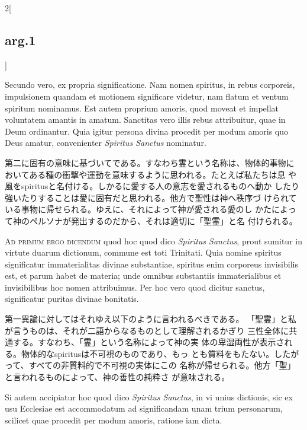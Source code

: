 \documentclass[paper=a4paper,fontsize=10pt,jafontsize=9pt,titlepage]{jlreq}
\begin{document}
\begin{paracol}{2}[\subsection{arg.1}]
\switchcolumn*

Secundo vero, ex propria
significatione. Nam nomen spiritus, in rebus corporeis, impulsionem
quandam et motionem significare videtur, nam flatum et ventum spiritum
nominamus. Est autem proprium amoris, quod moveat et impellat
voluntatem amantis in amatum. Sanctitas vero illis rebus attribuitur,
quae in Deum ordinantur. Quia igitur persona divina procedit per modum
amoris quo Deus amatur, convenienter {\itshape Spiritus Sanctus} nominatur.

\switchcolumn

第二に固有の意味に基づいてである。すなわち霊という名称は、物体的事物に
 おいてある種の衝撃や運動を意味するように思われる。たとえば私たちは息
 や風をspiritusと名付ける。しかるに愛する人の意志を愛されるものへ動か
 したり強いたりすることは愛に固有だと思われる。他方で聖性は神へ秩序づ
 けられている事物に帰せられる。ゆえに、それによって神が愛される愛のし
 かたによって神のペルソナが発出するのだから、それは適切に「聖霊」と名
 付けられる。

\switchcolumn*[\subsection{ad.1}]

{\scshape Ad primum ergo dicendum} quod hoc quod dico {\itshape Spiritus Sanctus}, prout
sumitur in virtute duarum dictionum, commune est toti Trinitati. Quia
nomine spiritus significatur immaterialitas divinae substantiae,
spiritus enim corporeus invisibilis est, et parum habet de materia;
unde omnibus substantiis immaterialibus et invisibilibus hoc nomen
attribuimus. Per hoc vero quod dicitur sanctus, significatur puritas
divinae bonitatis.

\switchcolumn

第一異論に対してはそれゆえ以下のように言われるべきである。
「聖霊」と私が言うものは、それが二語からなるものとして理解されるかぎり
 三性全体に共通する。すなわち、「霊」という名称によって神の実
 体の卑湿両性が表示される。物体的なspiritusは不可視のものであり、もっ
 とも質料をもたない。したがって、すべての非質料的で不可視の実体にこの
 名称が帰せられる。他方「聖」と言われるものによって、神の善性の純粋さ
 が意味される。

\switchcolumn*

Si autem accipiatur hoc quod dico {\itshape Spiritus Sanctus},
in vi unius dictionis, sic ex usu Ecclesiae est accommodatum ad
significandam unam trium personarum, scilicet quae procedit per modum
amoris, ratione iam dicta.


\end{paracol}
\end{document}
